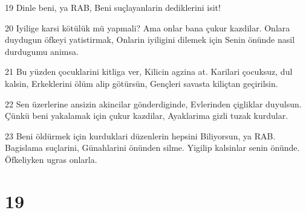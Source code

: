 \par 19 Dinle beni, ya RAB, Beni suçlayanlarin dediklerini isit!
\par 20 Iyilige karsi kötülük mü yapmali? Ama onlar bana çukur kazdilar. Onlara duydugun öfkeyi yatistirmak, Onlarin iyiligini dilemek için Senin önünde nasil durdugumu animsa.
\par 21 Bu yüzden çocuklarini kitliga ver, Kilicin agzina at. Karilari çocuksuz, dul kalsin, Erkeklerini ölüm alip götürsün, Gençleri savasta kiliçtan geçirilsin.
\par 22 Sen üzerlerine ansizin akincilar gönderdiginde, Evlerinden çigliklar duyulsun. Çünkü beni yakalamak için çukur kazdilar, Ayaklarima gizli tuzak kurdular.
\par 23 Beni öldürmek için kurduklari düzenlerin hepsini Biliyorsun, ya RAB. Bagislama suçlarini, Günahlarini önünden silme. Yigilip kalsinlar senin önünde. Öfkeliyken ugras onlarla.

\chapter{19}

